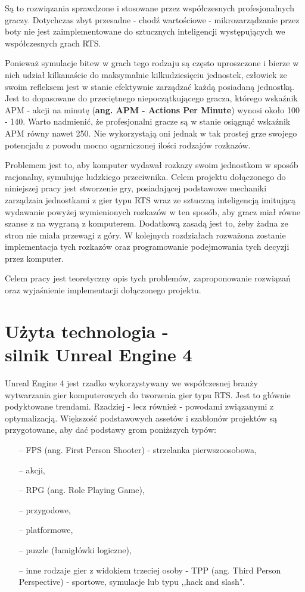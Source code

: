 \documentclass[12pt]{report}
\begin{document}
Są to rozwiązania sprawdzone i stosowane przez współczesnych profesjonalnych graczy. Dotychczas zbyt przesadne - chodź wartościowe - mikrozarządzanie przez boty nie jest zaimplementowane do sztucznych inteligencji występujących we współczesnych grach  RTS. 

Ponieważ symulacje bitew w grach tego rodzaju są często uproszczone i bierze w nich udział kilkanaście do maksymalnie kilkudziesięciu jednostek, człowiek ze swoim refleksem jest w stanie efektywnie zarządzać każdą posiadaną jednostką. Jest to dopasowane do przeciętnego niepoczątkującego gracza, którego wskaźnik APM - akcji na minutę (\textbf{ang. APM - Actions Per Minute}) wynosi około 100 - 140. Warto nadmienić, że profesjonalni gracze są w stanie osiągnąć wskaźnik APM równy nawet 250. Nie wykorzystają oni jednak w tak prostej grze swojego potencjału z powodu mocno ogarniczonej ilości rodzajów rozkazów.

Problemem jest to, aby komputer wydawał rozkazy swoim jednostkom w sposób racjonalny, symulując ludzkiego przeciwnika. Celem projektu dołączonego do niniejszej pracy jest stworzenie gry, posiadającej podstawowe mechaniki zarządzaia jednostkami z gier typu RTS wraz ze sztuczną inteligencją imitującą wydawanie powyżej wymienionych rozkazów w ten sposób, aby gracz miał równe szanse z na wygraną z komputerem. Dodatkową zasadą jest to, żeby żadna ze stron nie miała przewagi z góry. W kolejnych rozdziałach rozważona zostanie implementacja tych rozkazów oraz programowanie podejmowania tych decyzji przez komputer. 

Celem pracy jest teoretyczny opis tych problemów, zaproponowanie rozwiązań oraz wyjaśnienie implementacji dołączonego projektu.

\chapter{Użyta technologia - \\silnik Unreal Engine 4}

Unreal Engine 4 jest rzadko wykorzystywany we współczesnej branży wytwarzania gier komputerowych do tworzenia gier typu RTS. Jest to głównie podyktowane trendami. Rzadziej - lecz również - powodami związanymi z optymalizacją. Większość podstawowych assetów i szablonów projektów są przygotowane, aby dać podstawy grom poniższych typów:
\begin{itemize}
\item[--] FPS (ang. First Person Shooter) - strzelanka pierwszoosobowa,
\item[--] akcji,
\item[--] RPG (ang. Role Playing Game),
\item[--] przygodowe,
\item[--] platformowe,
\item[--] puzzle (łamigłówki logiczne),
\item[--] inne rodzaje gier z widokiem trzeciej osoby - TPP (ang. Third Person Perspective) - sportowe, symulacje lub typu ,,hack and slash".
\end{itemize}
\end{document}
